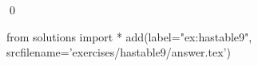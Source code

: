 
\begin{ex} 
  \label{ex:hastable9}
  
  \qed
\end{ex} 
\begin{python0}
from solutions import *
add(label="ex:hastable9",
    srcfilename='exercises/hastable9/answer.tex') 
\end{python0}
